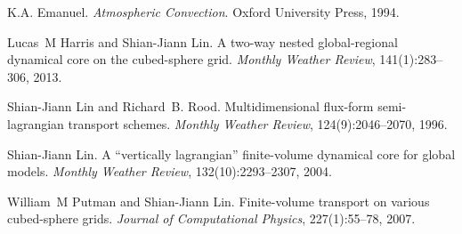 
\begin{DoxyDescription}
\item[\label{_CITEREF_emanuel1994atmospheric}%
\mbox{[}1\mbox{]}]K.\-A. Emanuel. {\itshape Atmospheric Convection}. Oxford University Press, 1994. 


\item[\label{_CITEREF_harris2013two}%
\mbox{[}2\mbox{]}]Lucas~M Harris and Shian-\/\-Jiann Lin. A two-\/way nested global-\/regional dynamical core on the cubed-\/sphere grid. {\itshape Monthly Weather Review}, 141(1)\-:283--306, 2013. 


\item[\label{_CITEREF_lin1996multiflux}%
\mbox{[}3\mbox{]}]Shian-\/\-Jiann Lin and Richard~B. Rood. Multidimensional flux-\/form semi-\/lagrangian transport schemes. {\itshape Monthly Weather Review}, 124(9)\-:2046--2070, 1996. 


\item[\label{_CITEREF_lin2004vertically}%
\mbox{[}4\mbox{]}]Shian-\/\-Jiann Lin. A “vertically lagrangian” finite-\/volume dynamical core for global models. {\itshape Monthly Weather Review}, 132(10)\-:2293--2307, 2004. 


\item[\label{_CITEREF_putman2007finite}%
\mbox{[}5\mbox{]}]William~M Putman and Shian-\/\-Jiann Lin. Finite-\/volume transport on various cubed-\/sphere grids. {\itshape Journal of Computational Physics}, 227(1)\-:55--78, 2007. 


\end{DoxyDescription}